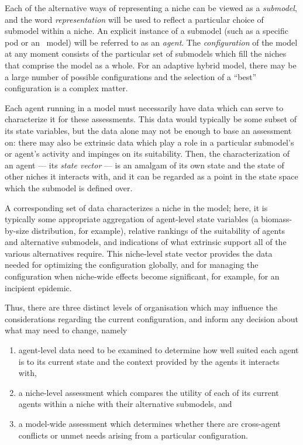 Each of the alternative ways of representing a niche can be viewed as
a \emph{sub\-model}, and the word \emph{rep\-re\-sen\-ta\-tion} will
be used to reflect a particular choice of sub\-model within a niche.
An explicit instance of a sub\-model (such as a specific pod or an
\SD\ model) will be referred to as an \emph{agent}.  The
\emph{con\-fig\-ur\-a\-tion} of the model at any moment consists of
the particular set of sub\-models which fill the niches that comprise
the model as a whole. For an adaptive hybrid model, there may be a
large number of possible con\-fig\-ur\-a\-tions and the selection of a
``best'' con\-fig\-ur\-a\-tion is a complex matter.

Each agent running in a model must necessarily have data which can
serve to characterize it for these assessments. This data would
typically be some subset of its state variables, but the data alone
may not be enough to base an assessment on: there may also be
extrinsic data which play a role in a particular sub\-model's or agent's
activity and impinges on its suitability. Then, the characterization
of an agent --- its \emph{state vector} --- is an amalgam of its own
state and the state of other niches it interacts with, and it can be
regarded as a point in the state space which the sub\-model is defined
over. 

A corresponding set of data characterizes a niche in the model; here,
it is typically some appropriate aggregation of agent-level state
variables (a biomass-by-size distribution, for example), relative
rankings of the suitability of agents and alternative sub\-models, and
indications of what extrinsic support all of the various alternatives
require. This niche-level state vector provides the data needed for
optimizing the con\-fig\-ur\-a\-tion globally,
and for managing the con\-fig\-ur\-a\-tion when niche-wide effects
become significant, for example, for an incipient epidemic.

Thus, there are three distinct levels of organisation which may
influence the considerations regarding the current configur\-ation, and
inform any decision about what may need to change, namely
\begin{enumerate}
\item agent-level data need to be examined to determine how well
  suited each agent is to its current state and the context provided
  by the agents it interacts with,
\item a niche-level assessment which compares the utility of each of
  its current agents within a niche with their alternative sub\-models,
  and
\item a model-wide assessment which determines whether there are
  cross-agent conflicts or unmet needs arising from a particular
  con\-fig\-ur\-a\-tion.
\end{enumerate}

